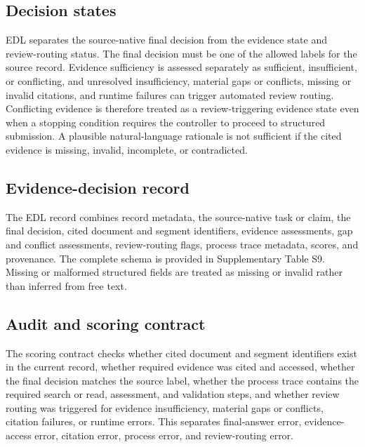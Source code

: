 \documentclass[11pt,a4paper]{article}
\begin{document}
\subsection{Decision states}

EDL separates the source-native final decision from the evidence state and review-routing status. The final decision must be one of the allowed labels for the source record. Evidence sufficiency is assessed separately as sufficient, insufficient, or conflicting, and unresolved insufficiency, material gaps or conflicts, missing or invalid citations, and runtime failures can trigger automated review routing. Conflicting evidence is therefore treated as a review-triggering evidence state even when a stopping condition requires the controller to proceed to structured submission. A plausible natural-language rationale is not sufficient if the cited evidence is missing, invalid, incomplete, or contradicted.

\subsection{Evidence-decision record}

The EDL record combines record metadata, the source-native task or claim, the final decision, cited document and segment identifiers, evidence assessments, gap and conflict assessments, review-routing flags, process trace metadata, scores, and provenance. The complete schema is provided in Supplementary Table S9. Missing or malformed structured fields are treated as missing or invalid rather than inferred from free text.

\subsection{Audit and scoring contract}

The scoring contract checks whether cited document and segment identifiers exist in the current record, whether required evidence was cited and accessed, whether the final decision matches the source label, whether the process trace contains the required search or read, assessment, and validation steps, and whether review routing was triggered for evidence insufficiency, material gaps or conflicts, citation failures, or runtime errors. This separates final-answer error, evidence-access error, citation error, process error, and review-routing error.
\end{document}
